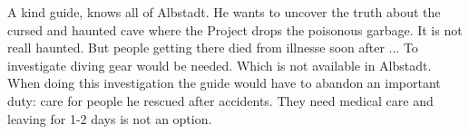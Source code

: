 \begin{npcBox}[title=Name]
    \begin{consequences}
    \item {}
    \item {}
    \item {}
    \end{consequences}
    
    \begin{npcDescription}
    A kind guide, knows all of Albstadt. He wants to uncover the truth about the cursed and haunted cave where the Project drops the poisonous garbage. It is not reall haunted. But people getting there died from illnesse soon after ...
    To investigate diving gear would be needed. Which is not available in Albstadt.
    When doing this investigation the guide would have to abandon an important duty: care for people he rescued after accidents. They need medical care and leaving for 1-2 days is not an option.
    \end{npcDescription}
    
\end{npcBox}



